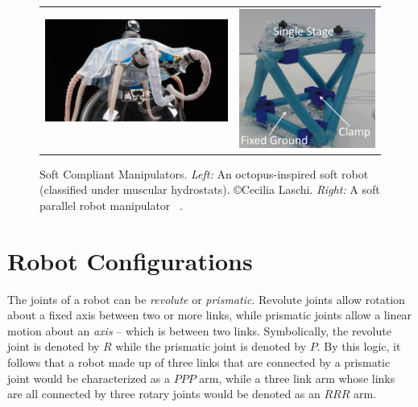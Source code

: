\begin{figure}[tb!]
	\centering
	\begin{tabular}{@{}c@{}c@{}}
		\includegraphics[width=0.50\linewidth ,height=0.4\columnwidth]{figures/octopus.jpg} \,\,
		&
		\includegraphics[width=0.48\columnwidth,height=0.4\columnwidth]{figures/soft_parallel.jpg}
	\end{tabular}
	\caption{Soft Compliant Manipulators. \textit{Left:} An octopus-inspired soft robot (classified under muscular hydrostats). \copyright Cecilia Laschi. \textit{Right:} A soft parallel robot manipulator ~\cite{hopkins2015synthesis}.}
	\label{fig:soft_robots}
\end{figure}

 \section{Robot Configurations}
 
The joints of a robot can be \textit{revolute} or \textit{prismatic}. Revolute joints allow rotation about a fixed axis between two or more links, while prismatic joints allow a linear motion about an \textit{axis} -- which is between two links. Symbolically, the revolute joint is denoted by $R$ while the prismatic joint is denoted by $P$. By this logic, it follows that a robot made up of three links that are connected by a prismatic joint would be characterized as a $PPP$ arm, while a three link arm whose links are all connected by three rotary joints would be denoted as an $RRR$ arm. 
 
